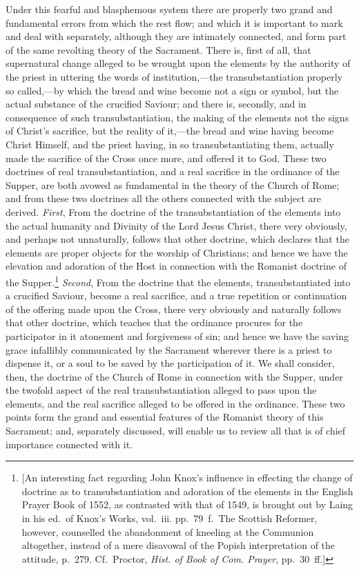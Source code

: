\documentclass[
  english,
]{book}
\begin{document}
Under this fearful and blasphemous system there are properly two grand and fundamental errors from which the rest flow; and which it is important to mark and deal with separately, although they are intimately connected, and form part of the same revolting theory of the Sacrament. There is, first of all, that supernatural change alleged to be wrought upon the elements by the authority of the priest in uttering the words of institution,---the transubstantiation properly so called,---by which the bread and wine become not a sign or symbol, but the actual substance of the crucified Saviour; and there is, secondly, and in consequence of such transubstantiation, the making of the elements not the signs of Christ's sacrifice, but the reality of it,---the bread and wine having become Christ Himself, and the priest having, in so transubstantiating them, actually made the sacrifice of the Cross once more, and offered it to God. These two doctrines of real transubstantiation, and a real sacrifice in the ordinance of the Supper, are both avowed as fundamental in the theory of the Church of Rome; and from these two doctrines all the others connected with the subject are derived. \emph{First}, From the doctrine of the transubstantiation of the elements into the actual humanity and Divinity of the Lord Jesus Christ, there very obviously, and perhaps not unnaturally, follows that other doctrine, which declares that the elements are proper objects for the worship of Christians; and hence we have the elevation and adoration of the Host in connection with the Romanist doctrine of the Supper.\footnote{{[}An interesting fact regarding John Knox's influence in effecting the change of doctrine as to transubstantiation and adoration of the elements in the English Prayer Book of 1552, as contrasted with that of 1549, is brought out by Laing in his ed.~of Knox's Works, vol.~iii. pp.~79~f.~The Scottish Reformer, however, counselled the abandonment of kneeling at the Communion altogether, instead of a mere disavowal of the Popish interpretation of the attitude, p.~279. Cf.~Proctor, \emph{Hist. of Book of Com. Prayer}, pp.~30~ff.{]}} \emph{Second}, From the doctrine that the elements, transubstantiated into a crucified Saviour, become a real sacrifice, and a true repetition or continuation of the offering made upon the Cross, there very obviously and naturally follows that other doctrine, which teaches that the ordinance procures for the participator in it atonement and forgiveness of sin; and hence we have the saving grace infallibly communicated by the Sacrament wherever there is a priest to dispense it, or a soul to be saved by the participation of it. We shall consider, then, the doctrine of the Church of Rome in connection with the Supper, under the twofold aspect of the real transubstantiation alleged to pass upon the elements, and the real sacrifice alleged to be offered in the ordinance. These two points form the grand and essential features of the Romanist theory of this Sacrament; and, separately discussed, will enable us to review all that is of chief importance connected with it.
\end{document}
